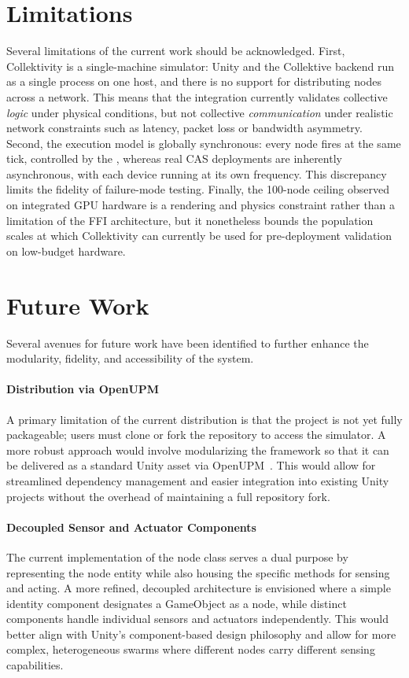 \section{Limitations}

Several limitations of the current work should be acknowledged. First, Collektivity is a single-machine simulator: Unity and the Collektive backend run as a single process on one host, and there is no support for distributing nodes across a network. This means that the integration currently validates collective \emph{logic} under physical conditions, but not collective \emph{communication} under realistic network constraints such as latency, packet loss or bandwidth asymmetry. Second, the execution model is globally synchronous: every node fires at the same tick, controlled by the , whereas real \ac{CAS} deployments are inherently asynchronous, with each device running at its own frequency. This discrepancy limits the fidelity of failure-mode testing. Finally, the 100-node ceiling observed on integrated GPU hardware is a rendering and physics constraint rather than a limitation of the \ac{FFI} architecture, but it nonetheless bounds the population scales at which Collektivity can currently be used for pre-deployment validation on low-budget hardware.

\section{Future Work}

Several avenues for future work have been identified to further enhance the modularity, fidelity, and accessibility of the system.

\paragraph{Distribution via OpenUPM}
A primary limitation of the current distribution is that the project is not yet fully packageable; users must clone or fork the repository to access the simulator. A more robust approach would involve modularizing the framework so that it can be delivered as a standard Unity asset via OpenUPM~\cite{openupm}. This would allow for streamlined dependency management and easier integration into existing Unity projects without the overhead of maintaining a full repository fork.

\paragraph{Decoupled Sensor and Actuator Components}
The current implementation of the node class serves a dual purpose by representing the node entity while also housing the specific methods for sensing and acting. A more refined, decoupled architecture is envisioned where a simple identity component designates a GameObject as a node, while distinct components handle individual sensors and actuators independently. This would better align with Unity's component-based design philosophy and allow for more complex, heterogeneous swarms where different nodes carry different sensing capabilities.

